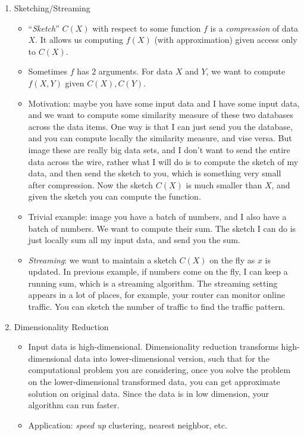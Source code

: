 \documentclass[11pt]{article}
\begin{document}
\begin{enumerate}
    \item{Sketching/Streaming}
        \begin{itemize}
            \item{``{\em Sketch}'' $C(X)$ with respect to some function $f$ is a {\em compression} of data $X$. It allows us computing $f(X)$ (with approximation) given access only to $C(X)$.}
            \item{Sometimes $f$ has $2$ arguments. For data $X$ and $Y$, we want to compute $f(X,Y)$ given $C(X), C(Y)$.}
            \item{Motivation: maybe you have some input data and I have some input data, and we want to compute some similarity measure of these two databases across the data items. One way is that I can just send you the database, and you can compute locally the similarity measure, and vise versa. But image these are really big data sets, and I don't want to send the entire data across the wire, rather what I will do is to compute the sketch of my data, and then send the sketch to you, which is something very small after compression. Now the sketch $C(X)$ is much smaller than $X$, and given the sketch you can compute the function. }
            \item{Trivial example: image you have a batch of numbers, and I also have a batch of numbers. We want to compute their sum. The sketch I can do is just locally sum all my input data, and send you the sum. }
            \item{{\em Streaming}: we want to maintain a sketch $C(X)$ on the fly as $x$ is updated. In previous example, if numbers come on the fly, I can keep a running sum, which is a streaming algorithm. The streaming setting appears in a lot of places, for example, your router can monitor online traffic. You can sketch the number of traffic to find the traffic pattern.}
        \end{itemize}
    \item{Dimensionality Reduction}
        \begin{itemize}
            \item{Input data is high-dimensional. Dimensionality reduction transforms high-dimensional data into lower-dimensional version, such that for the computational problem you are considering, once you solve the problem on the lower-dimensional transformed data, you can get approximate solution on original data. Since the data is in low dimension, your algorithm can run faster.}
            \item{Application: {\em speed up} clustering, nearest neighbor, etc.}

\end{itemize}
\end{enumerate}
\end{document}

